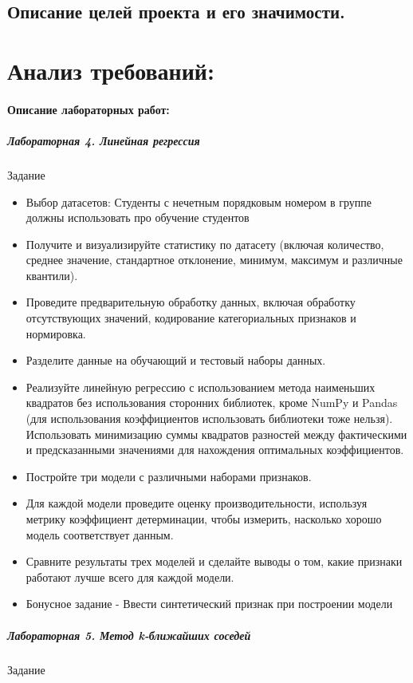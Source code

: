 \documentclass[12pt,onecolumn]{article}
\begin{document}
\subsection{Описание целей проекта и его значимости.}
\section{Анализ требований:}
\paragraph{Описание лабораторных работ:}
\subparagraph{Лабораторная 4. Линейная регрессия }
Задание
\begin{itemize}
  \item Выбор датасетов: Студенты с нечетным порядковым номером в группе должны использовать про обучение студентов
  \item Получите и визуализируйте статистику по датасету (включая количество, среднее значение, стандартное отклонение, минимум, максимум и различные квантили).
  \item Проведите предварительную обработку данных, включая обработку отсутствующих значений, кодирование категориальных признаков и нормировка.
  \item Разделите данные на обучающий и тестовый наборы данных.
  \item Реализуйте линейную регрессию с использованием метода наименьших квадратов без использования сторонних библиотек, кроме NumPy и Pandas (для использования коэффициентов использовать библиотеки тоже нельзя). Использовать минимизацию суммы квадратов разностей между фактическими и предсказанными значениями для нахождения оптимальных коэффициентов.
  \item Постройте три модели с различными наборами признаков.
  \item Для каждой модели проведите оценку производительности, используя метрику коэффициент детерминации, чтобы измерить, насколько хорошо модель соответствует данным.
  \item Сравните результаты трех моделей и сделайте выводы о том, какие признаки работают лучше всего для каждой модели.
  \item Бонусное задание - Ввести синтетический признак при построении модели
\end{itemize}
\subparagraph{Лабораторная 5. Метод k-ближайших соседей}
Задание
\end{document}
